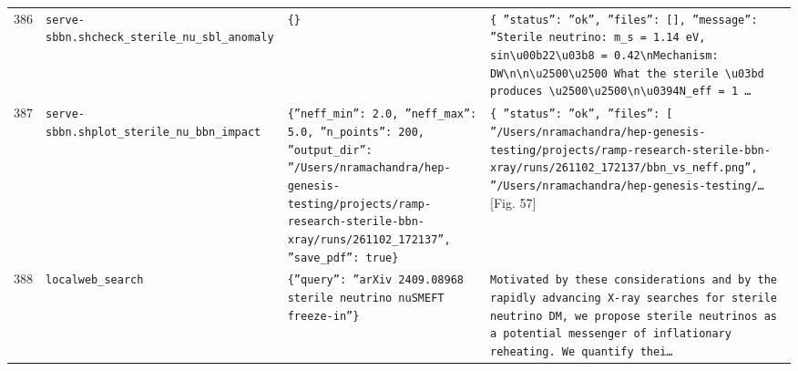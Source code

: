 \documentclass[11pt,a4paper]{article}
\begin{document}
\begin{longtable}{@{}p{}p{}p{}p{}@{}}
386 & \texttt{serve-sbbn.sh}\newline\texttt{check\_\allowbreak{}sterile\_\allowbreak{}nu\_\allowbreak{}sbl\_\allowbreak{}anomaly} & \texttt{\{\}\allowbreak{}} & \texttt{\{   ''status'':\allowbreak{} ''ok'',\allowbreak{}   ''files'':\allowbreak{} []\allowbreak{},\allowbreak{}   ''message'':\allowbreak{} ''Sterile neutrino:\allowbreak{} m\_\allowbreak{}s =\allowbreak{} 1.14 eV,\allowbreak{} sin\textbackslash{}\allowbreak{}u00b22\textbackslash{}\allowbreak{}u03b8 =\allowbreak{} 0.42\textbackslash{}\allowbreak{}nMechanism:\allowbreak{} DW\textbackslash{}\allowbreak{}n\textbackslash{}\allowbreak{}n\textbackslash{}\allowbreak{}u2500\textbackslash{}\allowbreak{}u2500 What the sterile \textbackslash{}\allowbreak{}u03bd produces \textbackslash{}\allowbreak{}u2500\textbackslash{}\allowbreak{}u2500\textbackslash{}\allowbreak{}n\textbackslash{}\allowbreak{}u0394N\_\allowbreak{}eff =\allowbreak{} 1 \ldots{}\allowbreak{}} \\
387 & \texttt{serve-sbbn.sh}\newline\texttt{plot\_\allowbreak{}sterile\_\allowbreak{}nu\_\allowbreak{}bbn\_\allowbreak{}impact} & \texttt{\{''neff\_\allowbreak{}min'':\allowbreak{} 2.0,\allowbreak{} ''neff\_\allowbreak{}max'':\allowbreak{} 5.0,\allowbreak{} ''n\_\allowbreak{}points'':\allowbreak{} 200,\allowbreak{} ''output\_\allowbreak{}dir'':\allowbreak{} ''/\allowbreak{}Users/\allowbreak{}nramachandra/\allowbreak{}hep-genesis-testing/\allowbreak{}projects/\allowbreak{}ramp-research-sterile-bbn-xray/\allowbreak{}runs/\allowbreak{}261102\_\allowbreak{}172137'',\allowbreak{} ''save\_\allowbreak{}pdf'':\allowbreak{} true\}\allowbreak{}} & \texttt{\{   ''status'':\allowbreak{} ''ok'',\allowbreak{}   ''files'':\allowbreak{} [     ''/\allowbreak{}Users/\allowbreak{}nramachandra/\allowbreak{}hep-genesis-testing/\allowbreak{}projects/\allowbreak{}ramp-research-sterile-bbn-xray/\allowbreak{}runs/\allowbreak{}261102\_\allowbreak{}172137/\allowbreak{}bbn\_\allowbreak{}vs\_\allowbreak{}neff.png'',\allowbreak{}     ''/\allowbreak{}Users/\allowbreak{}nramachandra/\allowbreak{}hep-genesis-testing/\allowbreak{}\ldots{}\allowbreak{}} [Fig. 57] \\
388 & \texttt{local}\newline\texttt{web\_\allowbreak{}search} & \texttt{\{''query'':\allowbreak{} ''arXiv 2409.08968 sterile neutrino nuSMEFT freeze-in''\}\allowbreak{}} & \texttt{Motivated by these considerations and by the rapidly advancing X-ray searches for sterile neutrino DM,\allowbreak{} we propose sterile neutrinos as a potential messenger of inflationary reheating. We quantify thei\ldots{}\allowbreak{}} \\

\end{longtable}
\end{document}
